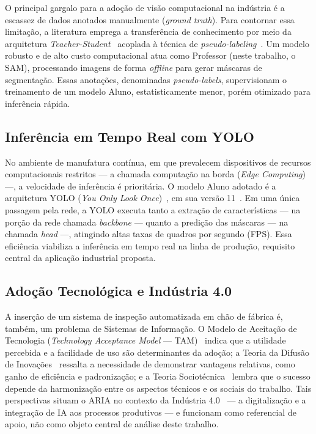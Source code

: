 \documentclass[12pt]{article}
\begin{document}
O principal gargalo para a adoção de visão computacional na indústria é a escassez de dados anotados manualmente (\textit{ground truth}). Para contornar essa limitação, a literatura emprega a transferência de conhecimento por meio da arquitetura \textit{Teacher-Student}~\cite{distill_hinton2015} acoplada à técnica de \textit{pseudo-labeling}~\cite{pseudolabel_lee2013}. Um modelo robusto e de alto custo computacional atua como Professor (neste trabalho, o SAM), processando imagens de forma \textit{offline} para gerar máscaras de segmentação. Essas anotações, denominadas \textit{pseudo-labels}, supervisionam o treinamento de um modelo Aluno, estatisticamente menor, porém otimizado para inferência rápida.

\subsection{Inferência em Tempo Real com YOLO}

No ambiente de manufatura contínua, em que prevalecem dispositivos de recursos computacionais restritos --- a chamada computação na borda (\textit{Edge Computing}) ---, a velocidade de inferência é prioritária. O modelo Aluno adotado é a arquitetura YOLO (\textit{You Only Look Once})~\cite{yolo_redmon2016}, em sua versão 11~\cite{yolo11_khanam2024}. Em uma única passagem pela rede, a YOLO executa tanto a extração de características --- na porção da rede chamada \textit{backbone} --- quanto a predição das máscaras --- na chamada \textit{head} ---, atingindo altas taxas de quadros por segundo (FPS). Essa eficiência viabiliza a inferência em tempo real na linha de produção, requisito central da aplicação industrial proposta.

\subsection{Adoção Tecnológica e Indústria 4.0}

A inserção de um sistema de inspeção automatizada em chão de fábrica é, também, um problema de Sistemas de Informação. O Modelo de Aceitação de Tecnologia (\textit{Technology Acceptance Model} --- TAM)~\cite{tam_davis1989} indica que a utilidade percebida e a facilidade de uso são determinantes da adoção; a Teoria da Difusão de Inovações~\cite{diffusion_rogers2003} ressalta a necessidade de demonstrar vantagens relativas, como ganho de eficiência e padronização; e a Teoria Sociotécnica~\cite{sociotech_trist1951} lembra que o sucesso depende da harmonização entre os aspectos técnicos e os sociais do trabalho. Tais perspectivas situam o ARIA no contexto da Indústria 4.0~\cite{industry40_lee2014} --- a digitalização e a integração de IA aos processos produtivos --- e funcionam como referencial de apoio, não como objeto central de análise deste trabalho.
\end{document}
